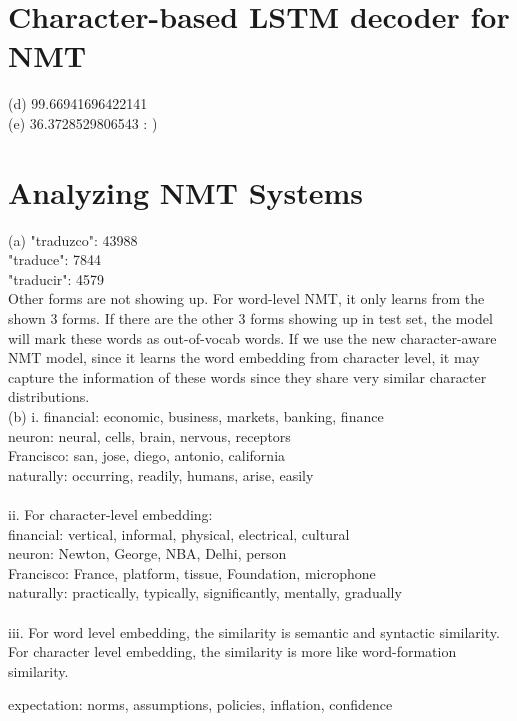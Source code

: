 \documentclass[11pt]{article}
\begin{document}
\section{Character-based LSTM decoder for NMT}
(d) 99.66941696422141\\
(e) 36.3728529806543 : )
\section{Analyzing NMT Systems}
(a) "traduzco": 43988\\
"traduce": 7844\\
"traducir": 4579\\
Other forms are not showing up. For word-level NMT, it only learns from the shown 3 forms. If there are the other 3 forms showing up in test set, the model will mark these words as out-of-vocab words. If we use the new character-aware NMT model, since it learns the word embedding from character level, it may capture the information of these words since they share very similar character distributions.\\
(b) i. financial: economic, business, markets, banking, finance\\
neuron: neural, cells, brain, nervous, receptors\\
Francisco: san, jose, diego, antonio, california\\
naturally: occurring, readily, humans, arise, easily\\\\
ii. For character-level embedding:\\
financial: vertical, informal, physical, electrical, cultural\\
neuron: Newton, George, NBA, Delhi, person\\
Francisco: France, platform, tissue, Foundation, microphone\\
naturally: practically, typically, significantly, mentally, gradually\\\\
iii. For word level embedding, the similarity is semantic and syntactic similarity. For character level embedding, the similarity is more like word-formation similarity.

expectation: norms, assumptions, policies, inflation, confidence
\end{document}
